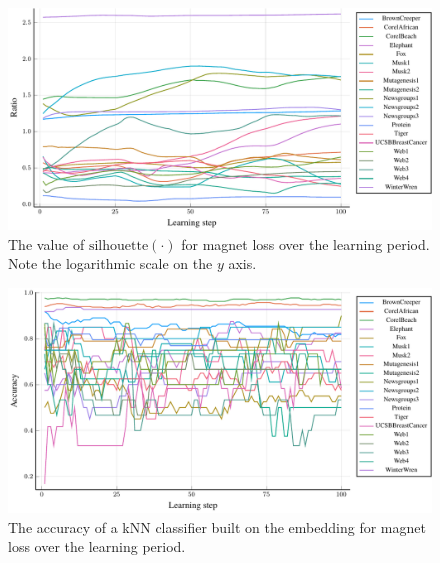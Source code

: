 \begin{figure}
  \centering
  \includegraphics[width=\textwidth]{images/magnet-toy/ratio/magnet-toy-ratio.pdf}
  \caption{The value of \( \mathrm{silhouette} \left( \cdot \right) \) for magnet loss over the learning period. Note the logarithmic scale on the \( y \) axis.}\label{fig:magnet-toy-ratio}
\end{figure}

\begin{figure}
  \centering
  \includegraphics[width=\textwidth]{images/magnet-toy/accuracy/magnet-toy-accuracy.pdf}
  \caption{The accuracy of a kNN classifier built on the embedding for magnet loss over the learning period.}\label{fig:magnet-toy-accuracy}
\end{figure}

